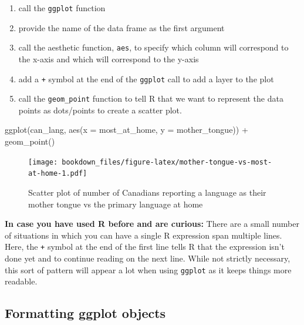 \documentclass[
]{krantz}
\makeatletter
\newenvironment{Shaded}{\begin{snugshade}}{\end{snugshade}}
\newcommand{\AttributeTok}[1]{\textcolor[rgb]{0.61,0.61,0.61}{#1}}
\newcommand{\FunctionTok}[1]{\textcolor[rgb]{0,0,0}{#1}}
\newcommand{\NormalTok}[1]{#1}
\newcommand{\SpecialCharTok}[1]{\textcolor[rgb]{0,0,0}{#1}}
\providecommand{\tightlist}{%
  \setlength{\itemsep}{0pt}\setlength{\parskip}{0pt}}
\renewenvironment{quote}{\begin{VF}}{\end{VF}}
\newenvironment{kframe}{%
\medskip{}
\setlength{\fboxsep}{.8em}
 \def\at@end@of@kframe{}%
 \ifinner\ifhmode%
  \def\at@end@of@kframe{\end{minipage}}%
  \begin{minipage}{\columnwidth}%
 \fi\fi%
 \def\FrameCommand##1{\hskip\@totalleftmargin \hskip-\fboxsep
 \colorbox{shadecolor}{##1}\hskip-\fboxsep
     \hskip-\linewidth \hskip-\@totalleftmargin \hskip\columnwidth}%
 \MakeFramed {\advance\hsize-\width
   \@totalleftmargin\z@ \linewidth\hsize
   \@setminipage}}%
 {\par\unskip\endMakeFramed%
 \at@end@of@kframe}
\renewenvironment{Shaded}{\begin{kframe}}{\end{kframe}}
\makeatother
\begin{document}
\begin{enumerate}
\def\labelenumi{\arabic{enumi}.}
\tightlist
\item
  call the \texttt{ggplot} function
\item
  provide the name of the data frame as the first argument
\item
  call the aesthetic function, \texttt{aes}, to specify which column will correspond to the x-axis and which will correspond to the y-axis
\item
  add a \texttt{+} symbol at the end of the \texttt{ggplot} call to add a layer to the plot
\item
  call the \texttt{geom\_point} function to tell R that we want to represent the data points as dots/points to create a scatter plot.
\end{enumerate}

\begin{Shaded}
\begin{Highlighting}[]
\FunctionTok{ggplot}\NormalTok{(can\_lang, }\FunctionTok{aes}\NormalTok{(}\AttributeTok{x =}\NormalTok{ most\_at\_home, }\AttributeTok{y =}\NormalTok{ mother\_tongue)) }\SpecialCharTok{+}
  \FunctionTok{geom\_point}\NormalTok{()}
\end{Highlighting}
\end{Shaded}

\begin{figure}
\centering
\texttt{[image: bookdown\_files/figure-latex/mother-tongue-vs-most-at-home-1.pdf]}
\caption{\label{fig:mother-tongue-vs-most-at-home}Scatter plot of number of Canadians reporting a language as their mother tongue vs the primary language at home}
\end{figure}

\begin{quote}
\textbf{In case you have used R before and are curious:}
There are a small number of situations in which you can have a single R expression span multiple lines.
Here, the \texttt{+} symbol at the end of the first line tells R that the expression isn't done yet and to
continue reading on the next line. While not strictly necessary, this sort of pattern will appear a
lot when using \texttt{ggplot} as it keeps things more readable.
\end{quote}

\hypertarget{formatting-ggplot-objects}{%
\subsection{Formatting ggplot objects}\label{formatting-ggplot-objects}}
\end{document}
